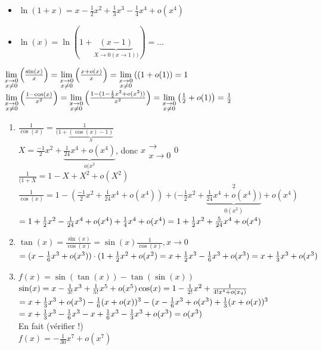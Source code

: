 \documentclass[12pt,a4paper]{article}
\begin{document}
{\begin{itemize}
	\item $\ln(1+x) = x-\frac{1}{2}x^2 + \frac{1}{3}x^3-\frac{1}{4}x^4+o(x^4)$
	\item $\ln(x) = \ln(1+\underbrace{(x-1)}_{X \to 0 (x\to 1))}) = ...$
\end{itemize}
$\lim\limits_{\substack{x\to 0 \\ x\neq 0}}\left(\frac{\sin(x)}{x}\right)=\lim\limits_{\substack{x\to 0 \\ x\neq 0}}\left(\frac{x+o(x)}{x}\right)=\lim\limits_{\substack{x\to 0 \\ x\neq 0}}\left((1+o(1)\right) = 1$\\
$\lim\limits_{\substack{x\to 0 \\ x\neq 0}}\left(\frac{1-\cos(x)}{x^2}\right) = \lim\limits_{\substack{x\to 0 \\ x\neq 0}}\left(\frac{1-(1-\frac{1}{2}x^2+o(x^2))}{x^2}\right) = \lim\limits_{\substack{x\to 0 \\ x\neq 0}}\left(\frac{1}{2}+o(1)\right) = \frac{1}{2}$
\\
\begin{enumerate}
	\item $\frac{1}{\cos(x)} = \frac{1}{(1+\underbrace{(\cos(x)-1)}_{X}}$\\
	$X = \frac{-1}{2}x^2 + \underbrace{\frac{1}{24}x^4 + o(x^4)}_{o(x^2}$, donc $x\substack{\longrightarrow \\ x\to 0} 0$\\
	$\frac{1}{(1+X} = 1-X+X^2+o(X^2)$\\
	$\frac{1}{\cos(x)} = 1-(\frac{-1}{2}x^2 + \frac{1}{24}x^4 + o(x^4)) +(-\frac{1}{2}x^2+\underbrace{\frac{1}{24}x^4+o(x^4))}_{0(x^2)}^2+o(x^4)$\\
	$=1+\frac{1}{2}x^2 - \frac{1}{24}x^4 + o(x^4) + \frac{1}{4}x^4 + o(x^4)\\
	 = 1+\frac{1}{2}x^2 + \frac{5}{24}x^4 + o(x^4)$
	 \item $\tan(x) = \frac{\sin(x)}{\cos(x)} = \sin(x) \frac{1}{\cos(x)}, x\to 0$\\
	 $=(x-\frac{1}{6}x^3 + o(x^3))\cdot(1+\frac{1}{2}x^2 + o(x^2)\\
	 =x+\frac{1}{2}x^3 -\frac{1}{6}x^3 + o(x^3)\\
	 =x+\frac{1}{3}x^3 + o(x^3)$
	 \item $f(x) = \sin(\tan(x))-\tan(\sin(x))$\\
	 $\sin(x) = x-\frac{1}{3!}x^3 +\frac{1}{5!}x^5 + o(x^5)\\
	 \cos(x) = 1-\frac{1}{2!}x^2+\frac{1}{4!x^4+o(x_4)}$\\
	 $=x+\frac{1}{3}x^3 + o(x^3)-\frac{1}{6}(x+o(x))^3\\
	 -(x-\frac{1}{6}x^3+o(x^3) + \frac{1}{3}(x+o(x))^3$\\
	 $=x+\frac{1}{3}x^3 - \frac{1}{6}x^3 - x + \frac{1}{6} x^3 - \frac{1}{3}x^3+o(x^3)\\
	 = o(x^3)$\\
	 En fait (vérifier !)\\
	 $f(x) = -\frac{1}{30}x^7 + o(x^7)$
\end{enumerate}


}
\end{document}
